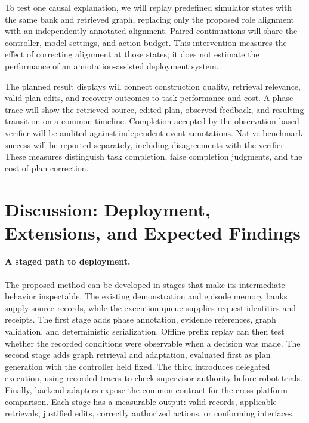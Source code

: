 \documentclass[10pt,twocolumn,letterpaper]{article}
\begin{document}
To test one causal explanation, we will replay predefined simulator states with the same bank and retrieved graph, replacing only the proposed role alignment with an independently annotated alignment. Paired continuations will share the controller, model settings, and action budget. This intervention measures the effect of correcting alignment at those states; it does not estimate the performance of an annotation-assisted deployment system.

The planned result displays will connect construction quality, retrieval relevance, valid plan edits, and recovery outcomes to task performance and cost. A phase trace will show the retrieved source, edited plan, observed feedback, and resulting transition on a common timeline. Completion accepted by the observation-based verifier will be audited against independent event annotations. Native benchmark success will be reported separately, including disagreements with the verifier. These measures distinguish task completion, false completion judgments, and the cost of plan correction.



\section{Discussion: Deployment, Extensions, and Expected Findings}
\label{sec:discussion}

\paragraph{A staged path to deployment.}
The proposed method can be developed in stages that make its intermediate behavior inspectable. The existing demonstration and episode memory banks supply source records, while the execution queue supplies request identities and receipts. The first stage adds phase annotation, evidence references, graph validation, and deterministic serialization. Offline prefix replay can then test whether the recorded conditions were observable when a decision was made. The second stage adds graph retrieval and adaptation, evaluated first as plan generation with the controller held fixed. The third introduces delegated execution, using recorded traces to check supervisor authority before robot trials. Finally, backend adapters expose the common contract for the cross-platform comparison. Each stage has a measurable output: valid records, applicable retrievals, justified edits, correctly authorized actions, or conforming interfaces.
\end{document}
